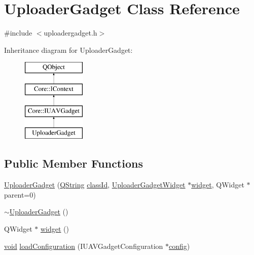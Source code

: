 \hypertarget{class_uploader_gadget}{\section{Uploader\-Gadget Class Reference}
\label{class_uploader_gadget}
}


{\ttfamily \#include $<$uploadergadget.\-h$>$}

Inheritance diagram for Uploader\-Gadget\-:\begin{figure}[H]
\begin{center}
\leavevmode
\includegraphics[height=4.000000cm]{class_uploader_gadget}
\end{center}
\end{figure}
\subsection*{Public Member Functions}
\begin{DoxyCompactItemize}
\item 
\hyperlink{group___y_modem_uploader_ga900f8a9e862c018370d1fa4331b55b12}{Uploader\-Gadget} (\hyperlink{group___u_a_v_objects_plugin_gab9d252f49c333c94a72f97ce3105a32d}{Q\-String} \hyperlink{group___core_plugin_ga3878fde66a57220608960bcc3fbeef2c}{class\-Id}, \hyperlink{class_uploader_gadget_widget}{Uploader\-Gadget\-Widget} $\ast$\hyperlink{group___y_modem_uploader_gac00d0fe0b9af2cb55ca33b6f0b3ab181}{widget}, Q\-Widget $\ast$parent=0)
\item 
\hyperlink{group___y_modem_uploader_ga8337b51a0e1630ae11e7ce9f5a9394b9}{$\sim$\-Uploader\-Gadget} ()
\item 
Q\-Widget $\ast$ \hyperlink{group___y_modem_uploader_gac00d0fe0b9af2cb55ca33b6f0b3ab181}{widget} ()
\item 
\hyperlink{group___u_a_v_objects_plugin_ga444cf2ff3f0ecbe028adce838d373f5c}{void} \hyperlink{group___y_modem_uploader_gada75c57a2323cdfbb4d0e349d223b1a3}{load\-Configuration} (I\-U\-A\-V\-Gadget\-Configuration $\ast$\hyperlink{deflate_8c_a4473b5227787415097004fd39f55185e}{config})
\end{DoxyCompactItemize}
